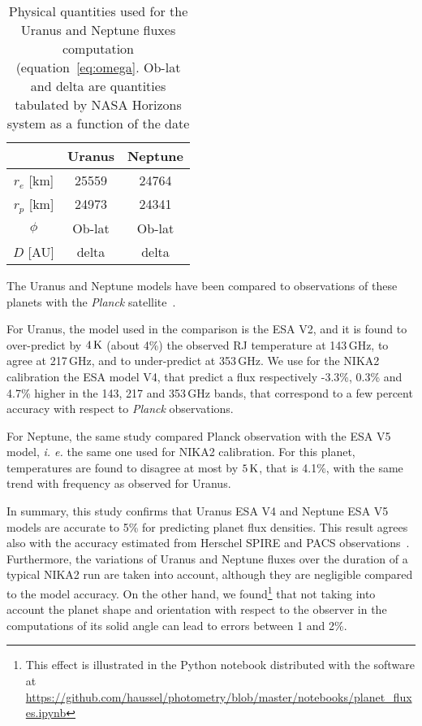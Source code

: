 \begin{table}[!ht]
\begin{center}
\begin{tabular}{|c|c|c|}
\hline
     & Uranus & Neptune \\
\hline
$r_{e}$ [km]  & 25559 & 24764 \\ 
\hline
$r_{p}$ [km]  & 24973 & 24341  \\
\hline
$\phi$         & Ob-lat & Ob-lat \\
\hline
$D$   [AU]    & delta   & delta \\
\hline
\end{tabular}
\end{center}
\caption[Primary calibrator flux models]{Physical quantities used for the Uranus and Neptune fluxes
  computation (equation~\ref{eq:omega}. Ob-lat and delta are quantities 
  tabulated by NASA Horizons system as a function of the date}
\label{tab:planetphysparam}
\end{table}

The Uranus and Neptune models have been compared to 
observations of these planets with the \emph{Planck}
satellite~\citep{PLCK-LII}.

For Uranus, the model used in the comparison
is the ESA V2, and it is found to over-predict by $4\,\rm{K}$ (about 4\%) the
observed RJ temperature at 143\,GHz, to agree at 217\,GHz, and
to under-predict at 353\,GHz. We use for the NIKA2 calibration the ESA
model V4, that predict a flux respectively -3.3\%, 0.3\% and 4.7\% higher in the
143, 217 and 353\,GHz bands, that correspond to a few percent accuracy
with respect to \emph{Planck} observations.

For Neptune, the same study compared Planck observation with the ESA V5
model, {\it i. e.} the same one used for NIKA2 calibration. For this
planet, temperatures are found to disagree at most by $5\, \rm{K}$, that is 4.1\%,
with the same trend with frequency as observed for Uranus.

In summary, this study confirms that Uranus ESA V4 and Neptune ESA V5
models are accurate to 5\% for predicting planet flux densities. This
result agrees also with the accuracy estimated from Herschel SPIRE
and PACS observations~\citep{Mueller2016, Swinyard2014}. 
Furthermore, the variations of Uranus and Neptune fluxes over the duration of a typical
NIKA2 run are taken into account, although they are negligible
compared to the model accuracy. On the other hand, we
found\footnote{This effect is illustrated in the Python notebook
  distributed with the software at \url{https://github.com/haussel/photometry/blob/master/notebooks/planet_fluxes.ipynb}} that not
taking into account the planet shape and orientation with respect to
the observer in the computations of its solid angle can lead to errors
between 1 and 2\%.


